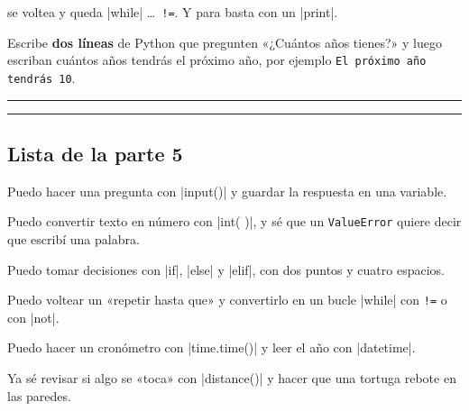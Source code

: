 \begin{think}
 se voltea y queda \py|while| \ldots\ \texttt{!=}. Y para  basta con un \py|print|.
\end{think}

\begin{puzzle}
Escribe \textbf{dos líneas} de Python que pregunten «¿Cuántos años tienes?» y luego escriban cuántos años tendrás el próximo año, por ejemplo \texttt{El próximo año tendrás 10}.

\vspace{4pt}
\rule{\linewidth}{0.4pt}\par\vspace{12pt}
\rule{\linewidth}{0.4pt}
\end{puzzle}

\subsection*{Lista de la parte 5}
\begingroup\setlength{\parskip}{5pt}
\tick Puedo hacer una pregunta con \py|input()| y guardar la respuesta en una variable.\par
\tick Puedo convertir texto en número con \py|int( )|, y sé que un \texttt{ValueError} quiere decir que escribí una palabra.\par
\tick Puedo tomar decisiones con \py|if|, \py|else| y \py|elif|, con dos puntos y cuatro espacios.\par
\tick Puedo voltear un «repetir hasta que» y convertirlo en un bucle \py|while| con \texttt{!=} o con \py|not|.\par
\tick Puedo hacer un cronómetro con \py|time.time()| y leer el año con \py|datetime|.\par
\tick Ya sé revisar si algo se «toca» con \py|distance()| y hacer que una tortuga rebote en las paredes.\par
\endgroup

